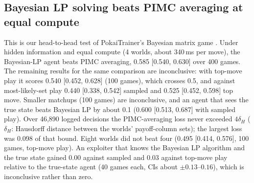 \documentclass[10pt]{article}
\theoremstyle{plain}
\theoremstyle{definition}
\theoremstyle{remark}
\begin{document}
\subsection{Bayesian LP solving beats PIMC averaging at equal compute}
\label{sec:exp-hidden}
This is our head-to-head test of PokaiTrainer's Bayesian matrix game \cite{Yu26}. Under hidden information and equal compute (4 worlds, about 340\,ms per move), the Bayesian-LP agent beats PIMC averaging, 0.585 [0.540, 0.630] over 400 games. The remaining results for the same comparison are inconclusive: with top-move play it scores 0.540 [0.452, 0.628] (100 games), which crosses 0.5, and against most-likely-set play 0.440 [0.338, 0.542] sampled and 0.525 [0.452, 0.598] top move. Smaller matchups (100 games) are inconclusive, and an agent that sees the true state beats Bayesian LP by about 0.1 (0.600 [0.513, 0.687] with sampled play). Over 46,890 logged decisions the PIMC-averaging loss never exceeded $4\delta_H$ ($\delta_H$: Hausdorff distance between the worlds' payoff-column sets); the largest loss was 0.098 of that bound. Eight worlds did not beat four (0.495 [0.414, 0.576], 100 games, top-move play). An exploiter that knows the Bayesian LP algorithm and the true state gained 0.00 against sampled and 0.03 against top-move play relative to the true-state agent (40 games each, CIs about $\pm0.13$--$0.16$), which is inconclusive rather than zero.
\end{document}
